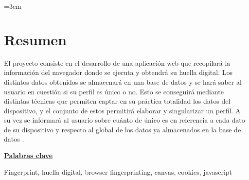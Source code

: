 \parindent=3em
\chapter{Resumen}

El proyecto consiste en el desarrollo de una aplicación web que recopilará la información del navegador donde se ejecuta y obtendrá su huella digital. Los distintos datos obtenidos se almacenará en una base de datos y se hará saber al usuario en cuestión si su perfil es único o no. Esto se conseguirá mediante distintas técnicas que permiten captar en su práctica totalidad los datos del dispositivo, y el conjunto de estos permitirá elaborar y singularizar un perfil. A su vez se informará al usuario sobre cuánto de único es en referencia a cada dato de su dispositivo y respecto al global de los datos ya almacenados en la base de datos . \par
\vspace{12mm}
\noindent
\underline{\Large{\textbf{Palabras clave}}}\par
\vspace{7mm}
\noindent
\normalsize{Fingerprint, huella digital, browser fingerprinting, canvas, cookies, javascript}


















